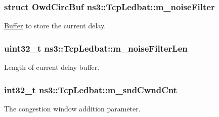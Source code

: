 \subsubsection[{\texorpdfstring{m\+\_\+noise\+Filter}{m_noiseFilter}}]{\setlength{\rightskip}{0pt plus 5cm}struct {\bf Owd\+Circ\+Buf} ns3\+::\+Tcp\+Ledbat\+::m\+\_\+noise\+Filter\hspace{0.3cm}{\ttfamily [private]}}\hypertarget{classns3_1_1TcpLedbat_a03ed887c2d0b9b02d50246759e31fe14}{}\label{classns3_1_1TcpLedbat_a03ed887c2d0b9b02d50246759e31fe14}


\hyperlink{classns3_1_1Buffer}{Buffer} to store the current delay. 

\subsubsection[{\texorpdfstring{m\+\_\+noise\+Filter\+Len}{m_noiseFilterLen}}]{\setlength{\rightskip}{0pt plus 5cm}uint32\+\_\+t ns3\+::\+Tcp\+Ledbat\+::m\+\_\+noise\+Filter\+Len\hspace{0.3cm}{\ttfamily [private]}}\hypertarget{classns3_1_1TcpLedbat_abbc074450211a63831a0bf5313252310}{}\label{classns3_1_1TcpLedbat_abbc074450211a63831a0bf5313252310}


Length of current delay buffer. 

\subsubsection[{\texorpdfstring{m\+\_\+snd\+Cwnd\+Cnt}{m_sndCwndCnt}}]{\setlength{\rightskip}{0pt plus 5cm}int32\+\_\+t ns3\+::\+Tcp\+Ledbat\+::m\+\_\+snd\+Cwnd\+Cnt\hspace{0.3cm}{\ttfamily [private]}}\hypertarget{classns3_1_1TcpLedbat_aad785b326c9667e16056ef4f23c12299}{}\label{classns3_1_1TcpLedbat_aad785b326c9667e16056ef4f23c12299}


The congestion window addition parameter. 

